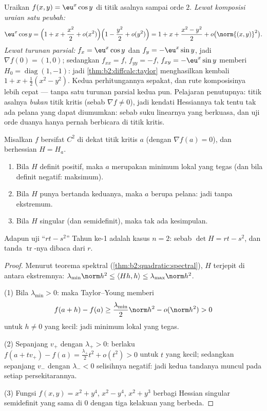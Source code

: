 \begin{example}\label{ex:b2:diffcalc:taylortwoways}
Uraikan $f(x, y) = \eu^x\cos y$ di titik asalnya sampai orde $2$.
\emph{Lewat komposisi uraian satu peubah:}
\[
\eu^x\cos y = \Bigl(1 + x + \frac{x^2}{2} +
o(x^2)\Bigr)\Bigl(1 - \frac{y^2}{2} + o(y^2)\Bigr)
= 1 + x + \frac{x^2 - y^2}{2} + o\bigl(\norm{(x,y)}^2\bigr) .
\]
\emph{Lewat turunan parsial:} $f_x = \eu^x\cos y$ dan $f_y =
-\eu^x\sin y$, jadi $\nabla f(0) = (1, 0)$; sedangkan $f_{xx} = f$,
$f_{yy} = -f$, $f_{xy} = -\eu^x\sin y$ memberi $H_0 =
\operatorname{diag}(1, -1)$: jadi \cref{thm:b2:diffcalc:taylor}
menghasilkan kembali $1 + x + \frac12(x^2 - y^2)$. Kedua perhitungannya
sepakat, dan rute komposisinya lebih cepat --- tanpa satu turunan
parsial kedua pun. Pelajaran penutupnya: titik asalnya \emph{bukan}
titik kritis (sebab $\nabla f \neq 0$), jadi kendati Hessiannya tak tentu
tak ada pelana yang dapat diumumkan: sebab suku linearnya yang berkuasa,
dan uji orde duanya hanya pernah berbicara di titik
kritis.
\end{example}

\begin{theorem}\label{thm:b2:diffcalc:extrema}
Misalkan $f$ bersifat $C^2$ di dekat titik kritis $a$ (dengan $\nabla f(a) = 0$),
dan berhessian $H = H_a$.
\begin{enumerate}
  \item Bila $H$ definit positif, maka $a$ merupakan minimum lokal yang tegas
        (dan bila definit negatif: maksimum).
  \item Bila $H$ punya  bertanda keduanya, maka $a$ berupa pelana: jadi tanpa
        ekstremum.
  \item Bila $H$ singular (dan semidefinit), maka tak ada kesimpulan.
\end{enumerate}
Adapun uji ``$rt - s^2$'' Tahun ke-1 adalah kasus $n = 2$: sebab $\det H = rt -
s^2$, dan tanda $\operatorname{tr}$-nya dibaca dari $r$.
\end{theorem}

\begin{proof}
Menurut teorema spektral (\cref{thm:b2:quadratic:spectral}),  $H$ terjepit di antara  ekstremnya:
$\lambda_{\min}\norm h^2 \leq \langle Hh, h\rangle \leq
\lambda_{\max}\norm h^2$.

(1) Bila $\lambda_{\min} > 0$: maka Taylor--Young memberi
\[
f(a + h) - f(a) \geq \frac{\lambda_{\min}}{2}\norm h^2 -
o(\norm h^2) > 0
\]
untuk $h \neq 0$ yang kecil: jadi minimum lokal yang tegas.

(2) Sepanjang  $v_+$ dengan $\lambda_+ > 0$: berlaku $f(a + tv_+) -
f(a) = \frac{\lambda_+}{2}t^2 + o(t^2) > 0$ untuk $t$ yang kecil; sedangkan sepanjang
$v_-$ dengan $\lambda_- < 0$ selisihnya negatif: jadi kedua tandanya
muncul pada setiap persekitarannya.

(3) Fungsi $f(x,y) = x^2 + y^4$, $x^2 - y^4$, $x^2 + y^3$ berbagi Hessian
singular semidefinit yang sama di $0$ dengan tiga kelakuan yang
berbeda.
\end{proof}

